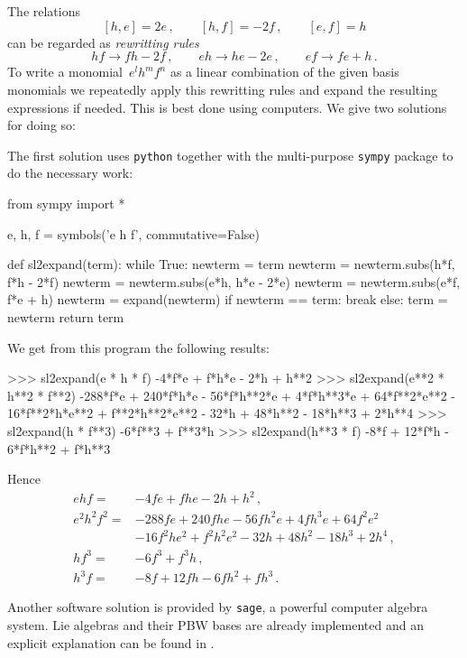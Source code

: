 \section{}

The relations
\[
  [h,e] = 2e \,,
  \qquad
  [h,f] = -2f \,,
  \qquad
  [e,f] = h
\]
can be regarded as \emph{rewritting rules}
\[
  hf \to fh - 2f \,,
  \qquad
  eh \to he - 2e \,,
  \qquad
  ef \to fe + h \,.
\]
To write a monomial~$e^l h^m f^n$ as a linear combination of the given basis monomials we repeatedly apply this rewritting rules and expand the resulting expressions if needed.
This is best done using computers.
We give two solutions for doing so:

The first solution uses \texttt{python} together with the multi-purpose \texttt{sympy} package to do the necessary work:

\begin{pythoncode}
from sympy import *

e, h, f = symbols('e h f', commutative=False)

def sl2expand(term):
  while True:
    newterm = term
    newterm = newterm.subs(h*f, f*h - 2*f)
    newterm = newterm.subs(e*h, h*e - 2*e)
    newterm = newterm.subs(e*f, f*e + h)
    newterm = expand(newterm)
    if newterm == term:
      break
    else:
      term = newterm
  return term
\end{pythoncode}
We get from this program the following results:
\begin{consoleoutput}
>>> sl2expand(e * h * f)
-4*f*e + f*h*e - 2*h + h**2
>>> sl2expand(e**2 * h**2 * f**2)
-288*f*e + 240*f*h*e - 56*f*h**2*e + 4*f*h**3*e + 64*f**2*e**2 - 16*f**2*h*e**2 + f**2*h**2*e**2 - 32*h + 48*h**2 - 18*h**3 + 2*h**4
>>> sl2expand(h * f**3)
-6*f**3 + f**3*h
>>> sl2expand(h**3 * f)
-8*f + 12*f*h - 6*f*h**2 + f*h**3
\end{consoleoutput}
Hence
\begin{align*}
  ehf
  ={}&
  - 4 f e + f h e - 2 h + h^2 \,,
  \\
  e^2 h^2 f^2
  ={}&
  -288 f e + 240 f h e - 56 f h^2 e + 4 f h^3 e + 64 f^2 e^2
  \\
  {}&
  - 16 f^2 h e^2 + f^2 h^2 e^2 - 32 h + 48 h^2 - 18 h^3 + 2 h^4 \,,
  \\
  h f^3
  ={}&
  -6 f^3 + f^3 h \,,
  \\
  h^3 f
  ={}&
  -8 f + 12 f h - 6 f h^2 + f  h^3 \,.
\end{align*}

Another software solution is provided by \texttt{sage}, a powerful computer algebra system.
Lie algebras and their PBW bases are already implemented and an explicit explanation can be found in \cite{sage_pbw}.

